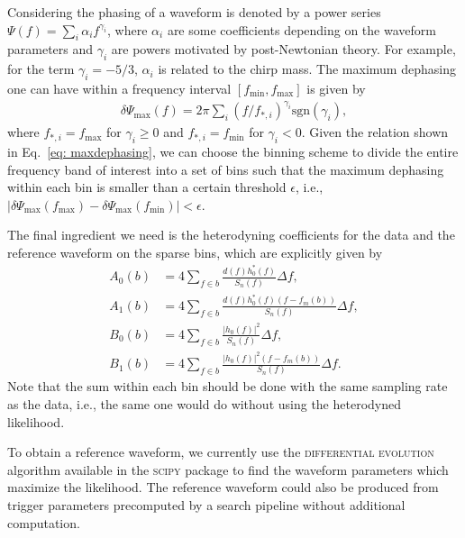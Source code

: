 \documentclass[twocolumn]{aastex631}
\newcommand{\te}[1]{\textbf{\color{pyRed}(TE: #1)}}
\begin{document}
Considering the phasing of a waveform is denoted by a power series $\Psi(f) =
\sum_i \alpha_i f^{\gamma_i}$, where $\alpha_i$ are some coefficients depending
on the waveform parameters and $\gamma_i$ are powers motivated by post-Newtonian
theory. For example, for the term $\gamma_i = -5/3$, $\alpha_i$ is related to
the chirp mass. The maximum dephasing one can have within a frequency interval
$[f_{\textrm{min}},f_{\textrm{max}}]$ is given by
\begin{align}
    \delta \Psi_{\textrm{max}}(f) = 2\pi \sum_{i} (f/f_{*,i})^{\gamma_i} \textrm{sgn}(\gamma_i),
\label{eq: maxdephasing}
\end{align}
where $f_{*,i} = f_{\textrm{max}}$ for $\gamma_i \geq 0$ and $f_{*,i} =
f_{\textrm{min}}$ for $\gamma_i<0$. Given the relation shown in Eq.~\eqref{eq:
maxdephasing}, we can choose the binning scheme to divide the entire frequency
band of interest into a set of bins such that the maximum dephasing within each
bin is smaller than a certain threshold $\epsilon$, i.e.,
$|\delta\Psi_{\textrm{max}}(f_{\textrm{max}}) -
\delta\Psi_{\textrm{max}}(f_{\textrm{min}})| < \epsilon$. 

The final ingredient we need is the heterodyning coefficients for the data and
the reference waveform on the sparse bins, which are explicitly given by
\begin{align}
    A_0(b) &= 4 \sum_{f \in b} \frac{d(f)h^*_0(f)}{S_n(f)} \Delta f, \\
    A_1(b) &= 4 \sum_{f \in b} \frac{d(f)h^*_0(f)(f-f_m(b))}{S_n(f)} \Delta f, \\
    B_0(b) &= 4 \sum_{f \in b} \frac{|h_0(f)|^2}{S_n(f)} \Delta f, \\
    B_1(b) &= 4 \sum_{f \in b} \frac{|h_0(f)|^2(f-f_m(b))}{S_n(f)} \Delta f.
\end{align}
Note that the sum within each bin should be done with the same sampling rate as
the data, i.e., the same one would do without using the heterodyned likelihood.


To obtain a reference waveform, we currently use the \textsc{differential
evolution} algorithm \cite{Storn1997DifferentialE} available in the
\textsc{scipy} package \cite{2020SciPy-NMeth} to find the waveform parameters
which maximize the likelihood.  The reference waveform could also be produced
from trigger parameters precomputed by a search pipeline without additional
computation.
\end{document}

